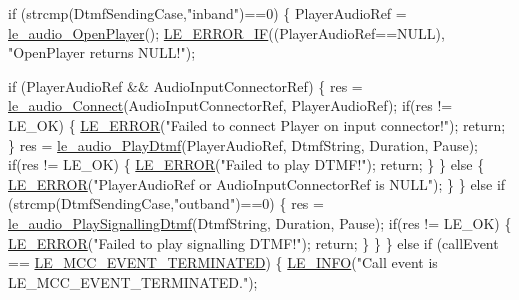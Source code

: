 \begin{DoxyCodeInclude}
{{{{{{{{{{        \textcolor{keywordflow}{if} (strcmp(DtmfSendingCase,\textcolor{stringliteral}{"inband"})==0)
        \{
            PlayerAudioRef = \hyperlink{le__audio__interface_8h_a92eb1b6377f50ff07b97c5b8546f01ec}{le\_audio\_OpenPlayer}();
            \hyperlink{le__log_8h_aceaf11a11691d6c676e36dd317b38dbd}{LE\_ERROR\_IF}((PlayerAudioRef==NULL), \textcolor{stringliteral}{"OpenPlayer returns NULL!"});

            \textcolor{keywordflow}{if} (PlayerAudioRef && AudioInputConnectorRef)
            \{
                res = \hyperlink{le__audio__interface_8h_a338df65b2fb1ae0140d86880adbcf0de}{le\_audio\_Connect}(AudioInputConnectorRef, PlayerAudioRef);
                \textcolor{keywordflow}{if}(res != LE\_OK)
                \{
                    \hyperlink{le__log_8h_a353590f91b3143a7ba3a416ae5a50c3d}{LE\_ERROR}(\textcolor{stringliteral}{"Failed to connect Player on input connector!"});
                    \textcolor{keywordflow}{return};
                \}
                res = \hyperlink{le__audio__interface_8h_ab9d062cda7010c3c97e0dfdc52f7470e}{le\_audio\_PlayDtmf}(PlayerAudioRef, DtmfString, Duration, Pause);
                \textcolor{keywordflow}{if}(res != LE\_OK)
                \{
                    \hyperlink{le__log_8h_a353590f91b3143a7ba3a416ae5a50c3d}{LE\_ERROR}(\textcolor{stringliteral}{"Failed to play DTMF!"});
                    \textcolor{keywordflow}{return};
                \}
            \}
            \textcolor{keywordflow}{else}
            \{
                \hyperlink{le__log_8h_a353590f91b3143a7ba3a416ae5a50c3d}{LE\_ERROR}(\textcolor{stringliteral}{"PlayerAudioRef or AudioInputConnectorRef is NULL"});
            \}
        \}
        \textcolor{keywordflow}{else} \textcolor{keywordflow}{if} (strcmp(DtmfSendingCase,\textcolor{stringliteral}{"outband"})==0)
        \{
            res = \hyperlink{le__audio__interface_8h_af3b056db8153ce71fb3ca1124edecd13}{le\_audio\_PlaySignallingDtmf}(DtmfString, Duration, Pause);
            \textcolor{keywordflow}{if}(res != LE\_OK)
            \{
                \hyperlink{le__log_8h_a353590f91b3143a7ba3a416ae5a50c3d}{LE\_ERROR}(\textcolor{stringliteral}{"Failed to play signalling DTMF!"});
                \textcolor{keywordflow}{return};
            \}
        \}
    \}
    \textcolor{keywordflow}{else} \textcolor{keywordflow}{if} (callEvent == \hyperlink{le__mcc__interface_8h_aefc4679ffa76d0e04c578572c22f06cfa38b7c4ab21fa9828be8169372e41ae98}{LE\_MCC\_EVENT\_TERMINATED})
    \{
        \hyperlink{le__log_8h_a23e6d206faa64f612045d688cdde5808}{LE\_INFO}(\textcolor{stringliteral}{"Call event is LE\_MCC\_EVENT\_TERMINATED."});
}}}}}}}}}}
\end{DoxyCodeInclude}
